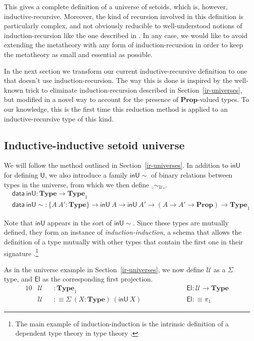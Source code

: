 \documentclass[a4paper,UKenglish,cleveref, autoref, thm-restate]{lipics-v2019}
\newcommand{\setoidU}{\mathcal{U}}
\newcommand{\inU}{\mathsf{inU}}
\newcommand{\inUU}{\mathsf{inU{\sim}}}
\newcommand{\mType}{\mathbf{Type}}
\newcommand{\mProp}{\mathbf{Prop}}
\newcommand{\U}{\textsf{U}}
\newcommand{\El}{\textsf{El}}
\begin{document}
This gives a complete definition of a universe of setoids, which is, however,
inductive-recursive. Moreover, the kind of recursion involved in this definition
is particularly complex, and not obviously reducible to well-understood notions
of induction-recursion like the one described in \cite{dybjer-setzer}. In any
case, we would like to avoid extending the metatheory with any form of
induction-recursion in order to keep the metatheory as small and
essential as possible.

In the next section we transform our current inductive-recursive definition to
one that doesn't use induction-recursion.
%
The way this is done is inspired by the well-known trick to eliminate
induction-recursion described in Section~\ref{ir-universes}, but modified in a
novel way to account for the presence of $\mProp$-valued types. To our
knowledge, this is the first time this reduction method is applied to an
inductive-recursive type of this kind.

\subsection{Inductive-inductive setoid universe}\label{ii-universe}

We will follow the method outlined in Section~\ref{ir-universes}. In
addition to $\inU$ for defining $\U$, we also introduce a family
$\inUU$ of binary relations between types in the universe, from which we
then define $\_\sim_{\setoidU}\_$.
%
\begin{align*}
  & \textsf{data}\ \inU : \mType \to \mType_1 \\
  & \textsf{data}\ \inUU : \{A\ A' : \mType\} \to \inU\ A \to \inU\ A' \to (A \to A' \to \mProp) \to \mType_1
\end{align*}

Note that $\inU$ appears in the sort of $\inUU$. Since these types are
mutually defined, they form an instance of \emph{induction-induction}, a schema
that allows the definition of a type mutually with other types that contain the
first one in their signature \cite{ii}.\footnote{The main example of
  induction-induction is the intrinsic definition of a dependent type theory in
  type theory \cite{tt-in-tt}.}

As in the universe example in Section~\ref{ir-universes}, we now define
$\setoidU$ as a $\Sigma$ type, and $\El$ as the corresponding first projection.
\begin{alignat*}{10}
  & \setoidU && : \mType_1 && \El : \setoidU \to \mType \\
  & \setoidU && :\equiv \Sigma\ (X : \mType)\ (\inU\ X) \hspace{5em} && \El :\equiv \pi_1
\end{alignat*}
\end{document}
